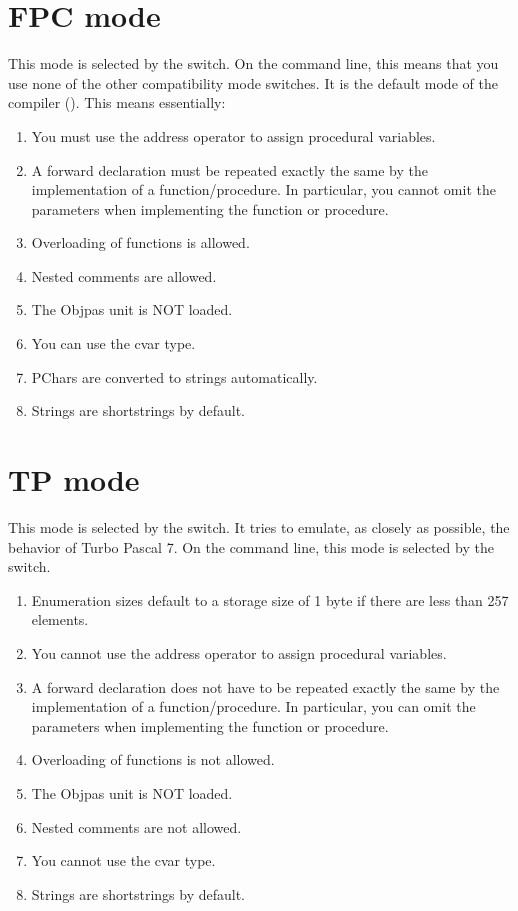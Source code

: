 \section{FPC mode}
This mode is selected by the  switch. On the command line,
this means that you use none of the other compatibility mode switches.
It is the default mode of the compiler (). This means essentially:
\begin{enumerate}
\item You must use the address operator to assign procedural variables.
\item A forward declaration must be repeated exactly the same by the
implementation of a function/procedure. In particular, you cannot omit the
parameters when implementing the function or procedure.
\item Overloading of functions is allowed.
\item Nested comments are allowed.
\item The Objpas unit is NOT loaded.
\item You can use the cvar type.
\item PChars are converted to strings automatically.
\item Strings are shortstrings by default.
\end{enumerate}

\section{TP mode}
This mode is selected by the  switch. It tries to emulate, 
as closely as possible, the behavior of Turbo Pascal 7. On the command line,
this mode is selected by the  switch.

\begin{enumerate}
\item Enumeration sizes default to a storage size of 1 byte if there
are less than 257 elements.
\item You cannot use the address operator to assign procedural variables.
\item A forward declaration does not have to be repeated exactly the same by the
implementation of a function/procedure. In particular, you can omit the
parameters when implementing the function or procedure.
\item Overloading of functions is not allowed.
\item The Objpas unit is NOT loaded.
\item Nested comments are not allowed.
\item You cannot use the cvar type.
\item Strings are shortstrings by default.
\end{enumerate}


